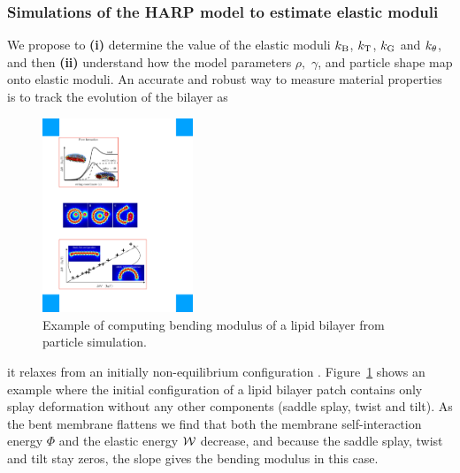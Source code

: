 \subsubsection{Simulations of the HARP model to estimate elastic moduli}
We propose to
%
%
%
{\bf (i)} determine the value of the elastic moduli $k_{\mathrm{B}}$,
$k_{\mathrm{T}}$, $k_{\mathrm{G}}$ and $k_{\theta}$, and then {\bf (ii)} understand how the model parameters $\rho,$ $\gamma$, and particle shape map onto elastic moduli. 
An accurate and robust way to measure material properties is to track the evolution of the bilayer as
%
\begin{figure}
\vspace{-0.3cm}
\centerline{\includegraphics[width=0.4\textwidth]{Figures/Flattening.pdf}}
\vspace{-0.2cm}
\caption{\label{fig:flattening} \footnotesize Example of computing
  bending modulus of a lipid bilayer from particle simulation.}
\end{figure}
it relaxes from an initially non-equilibrium configuration \cite{PhysRevLett.117.188102}.
Figure~\ref{fig:flattening} shows an example where the initial configuration of a lipid bilayer patch contains only
splay deformation without any other components (saddle splay, twist and tilt). 
As the bent membrane flattens we find that both the membrane self-interaction energy $\Phi$ and the elastic energy ${\cal W}$ decrease,
and because the saddle splay, twist and tilt stay zeros, the slope gives the bending modulus in this case. 


